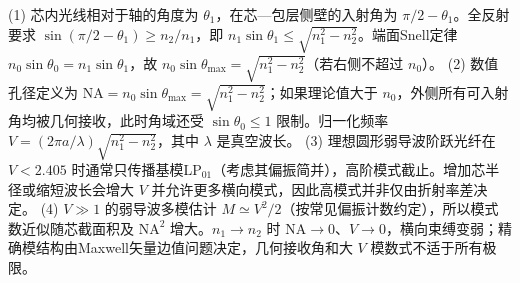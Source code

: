 (1) 芯内光线相对于轴的角度为 \(\theta_1\)，在芯—包层侧壁的入射角为 \(\pi/2-\theta_1\)。全反射要求 \(\sin(\pi/2-\theta_1)\ge n_2/n_1\)，即 \(n_1\sin\theta_1\le\sqrt{n_1^2-n_2^2}\)。端面Snell定律 \(n_0\sin\theta_0=n_1\sin\theta_1\)，故 \(n_0\sin\theta_{\max}=\sqrt{n_1^2-n_2^2}\)（若右侧不超过 \(n_0\)）。
(2) 数值孔径定义为 \(\mathrm{NA}=n_0\sin\theta_{\max}=\sqrt{n_1^2-n_2^2}\)；如果理论值大于 \(n_0\)，外侧所有可入射角均被几何接收，此时角域还受 \(\sin\theta_0\le1\) 限制。归一化频率 \(V=(2\pi a/\lambda)\sqrt{n_1^2-n_2^2}\)，其中 \(\lambda\) 是真空波长。
(3) 理想圆形弱导波阶跃光纤在 \(V<2.405\) 时通常只传播基模LP\(_{01}\)（考虑其偏振简并），高阶模式截止。增加芯半径或缩短波长会增大 \(V\) 并允许更多横向模式，因此高模式并非仅由折射率差决定。
(4) \(V\gg1\) 的弱导波多模估计 \(M\simeq V^2/2\)（按常见偏振计数约定），所以模式数近似随芯截面积及 \(\mathrm{NA}^2\) 增大。\(n_1\to n_2\) 时 \(\mathrm{NA}\to0\)、\(V\to0\)，横向束缚变弱；精确模结构由Maxwell矢量边值问题决定，几何接收角和大 \(V\) 模数式不适于所有极限。

